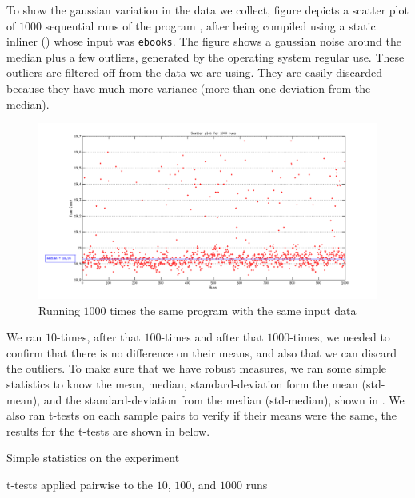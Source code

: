 
To show the gaussian variation in the data we collect, figure  depicts a scatter plot of $1000$ sequential runs of the program \bzip, after being compiled using a static inliner (\llvm) whose input was {\tt ebooks}. The figure shows a gaussian noise around the median plus a few outliers, generated by the operating system regular use. These outliers are filtered off from the data we are using. They are easily discarded because they have much more variance (more than one deviation from the median).

\begin{figure}
  \centering
  \includegraphics[width=1.00\linewidth]{Figures/1000Runs}
  \caption{Running $1000$ times the same program with the same input data}
  \label{fig:gauss}
\end{figure}

We ran $10$-times, after that $100$-times and after that $1000$-times, we needed to confirm that there is no difference on their means, and also that we can discard the outliers. To make sure that we have robust measures, we ran some simple statistics to know the mean, median, standard-deviation form the mean (std-mean), and the standard-deviation from the median (std-median), shown in . We also ran t-tests on each sample pairs to verify if their means were the same, the results for the t-tests are shown in  below.

\begin{table}
  \centering
  \begin{tiny}
  
  \end{tiny}
  \caption{Simple statistics on the experiment}
  \label{tab:robustTest}
\end{table}

\begin{table}
  \centering
  \begin{tiny}
  
  \end{tiny}
  \caption{t-tests applied pairwise to the $10$, $100$, and $1000$ runs}
  \label{tab:ttest}
\end{table}

